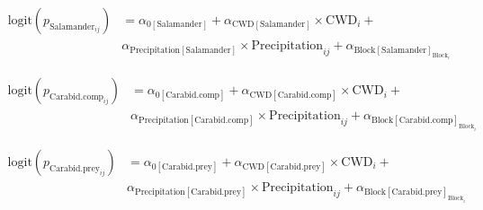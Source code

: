 \begin{align}
  \text{logit}(p_{\text{Salamander}_{ij}}) &= \alpha_{0[\text{Salamander}]} + \alpha_{\text{CWD}[\text{Salamander}]} \times \text{CWD}_i + \nonumber \\
  &\alpha_{\text{Precipitation}[\text{Salamander}]} \times \text{Precipitation}_{ij} + \alpha_{\text{Block}[\text{Salamander}]_{\text{Block}_i}} \nonumber
\end{align}

\begin{align}
  \text{logit}(p_{\text{Carabid.comp}_{ij}}) &= \alpha_{0[\text{Carabid.comp}]} + \alpha_{\text{CWD}[\text{Carabid.comp}]} \times \text{CWD}_i + \\
  &\alpha_{\text{Precipitation}[\text{Carabid.comp}]} \times \text{Precipitation}_{ij} + \alpha_{\text{Block}[\text{Carabid.comp}]_{\text{Block}_i}} \nonumber 
\end{align}

\begin{align}
  \text{logit}(p_{\text{Carabid.prey}_{ij}}) &= \alpha_{0[\text{Carabid.prey}]} + \alpha_{\text{CWD}[\text{Carabid.prey}]} \times \text{CWD}_i + \nonumber \\
  &\alpha_{\text{Precipitation}[\text{Carabid.prey}]} \times \text{Precipitation}_{ij} + \alpha_{\text{Block}[\text{Carabid.prey}]_{\text{Block}_i}} \nonumber 
\end{align}





